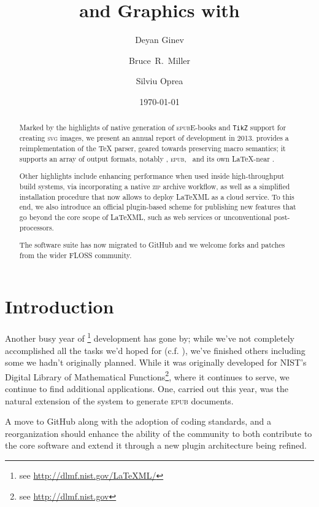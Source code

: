 \documentclass{llncs}
\title{\ebooks and Graphics with \LaTeXML}
\author{Deyan Ginev\inst{1} \and Bruce~R.~Miller\inst{2} \and Silviu Oprea\inst{3}}
\institute{Computer Science, Jacobs University Bremen, Germany
 \and National Institute of Standards and Technology, Gaithersburg, MD, USA
 \and University of Oxford, Oxford, UK.}
\date{\today}
\def\ebooks{\mbox{E-books}\xspace}
\def\epub{\textsc{epub}\xspace}
\def\svg{\textsc{svg}\xspace}
\def\zip{\textsc{zip}\xspace}
\def\tikz{\texttt{TikZ}\xspace}
\begin{document}
\maketitle
\begin{abstract} 
Marked by the highlights of native generation of \epub \ebooks and \tikz support for creating \svg images, we present an annual report of {\LaTeXML} development in 2013. {\LaTeXML} provides a reimplementation of the {\TeX} parser, geared towards preserving macro semantics; it supports an array of output formats, notably , \epub, \XHTML\ and its own \LaTeX-near \XML.

Other highlights include enhancing performance when used inside high-throughput build systems, via incorporating a native \zip archive workflow, as well as a simplified installation procedure that now allows to deploy LaTeXML as a cloud service. To this end, we also introduce an official plugin-based scheme for publishing new features that go beyond the core scope of LaTeXML, such as web services or unconventional post-processors.

The software suite has now migrated to GitHub and we welcome forks and patches from the wider FLOSS community.
\end{abstract}

\section{Introduction}
Another busy year of {\LaTeXML} \footnote{see \url{http://dlmf.nist.gov/LaTeXML/}} development has gone by;
while we've not completely accomplished all the tasks we'd hoped for (c.f. \cite{GinMil:latexmlCICM13}),
we've finished others including some we hadn't originally planned.
While it was originally developed for NIST's Digital Library of Mathematical Functions\footnote{see \url{http://dlmf.nist.gov}},
where it continues to serve, we continue to find additional applications.
One, carried out this year, was the natural extension of the system to generate \epub documents. 

A move to GitHub along with
the adoption of coding standards, and a reorganization should enhance
the ability of the community to both contribute to the core software
and extend it through a new plugin architecture being refined.
\end{document}
